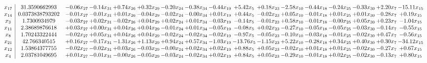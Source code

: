 \documentclass[9pt]{article}
\begin{document}
 \[\begin{array}{c| c c@{\hskip 2pt} c@{\hskip 2pt} c@{\hskip 2pt} c@{\hskip 2pt} c@{\hskip 2pt} c@{\hskip 2pt} c@{\hskip 2pt} c@{\hskip 2pt} c@{\hskip 2pt} c@{\hskip 2pt} c@{\hskip 2pt} c@{\hskip 2pt} c@{\hskip 2pt} c@{\hskip 2pt} c@{\hskip 2pt} }
 x_{17}   &  31.3590662993 & -0.06 x_{27} & -0.14 x_{31} & +  0.74 x_{26} & +  0.32 x_{29} & -0.20 x_{24} & -0.38 x_{34} & -0.44 x_{19} & +  5.42 x_{5} & +  0.18 x_{23} & -2.58 x_{10} & -0.44 x_{18} & -0.24 x_{25} & -0.33 x_{30} & +  2.20 x_{7} & -15.11 x_{15}\\
 x_{14}   &  0.0373838793202 & -0.01 x_{27} & -0.01 x_{31} & +  0.01 x_{26} & -0.04 x_{29} & -0.02 x_{24} & -0.00 x_{34} & +  0.01 x_{19} & +  0.44 x_{5} & -0.02 x_{23} & +  0.05 x_{10} & -0.01 x_{18} & +  0.01 x_{25} & +  0.01 x_{30} & -0.28 x_{7} & +  0.19 x_{15}\\
 x_{3}   &  1.7300934979 & -0.03 x_{27} & +  0.02 x_{31} & -0.02 x_{26} & +  0.04 x_{29} & +  0.02 x_{24} & +  0.01 x_{34} & -0.03 x_{19} & -0.14 x_{5} & -0.01 x_{23} & +  0.58 x_{10} & -0.01 x_{18} & -0.00 x_{25} & +  0.05 x_{30} & +  0.23 x_{7} & -1.04 x_{15}\\
 x_{11}   &  2.38689876618 & +  0.03 x_{27} & +  0.00 x_{31} & +  0.04 x_{26} & +  0.04 x_{29} & -0.01 x_{24} & +  0.01 x_{34} & -0.05 x_{19} & -0.08 x_{5} & +  0.02 x_{23} & -0.27 x_{10} & -0.05 x_{18} & -0.05 x_{25} & -0.03 x_{30} & -0.14 x_{7} & -0.55 x_{15}\\
 x_{8}   &  1.70243322444 & -0.02 x_{27} & +  0.05 x_{31} & +  0.04 x_{26} & +  0.04 x_{29} & -0.02 x_{24} & -0.02 x_{34} & -0.02 x_{19} & -0.97 x_{5} & -0.05 x_{23} & -0.10 x_{10} & -0.03 x_{18} & -0.01 x_{25} & -0.02 x_{30} & +  0.47 x_{7} & -0.56 x_{15}\\
 x_{21}   &  42.766340515 & +  0.16 x_{27} & -0.17 x_{31} & -1.31 x_{26} & +  1.13 x_{29} & +  0.94 x_{24} & +  0.57 x_{34} & -1.03 x_{19} & -13.76 x_{5} & -1.15 x_{23} & +  5.22 x_{10} & -0.28 x_{18} & +  0.34 x_{25} & +  0.40 x_{30} & +  0.30 x_{7} & -34.12 x_{15}\\
 x_{12}   &  1.53864377755 & -0.02 x_{27} & -0.02 x_{31} & +  0.03 x_{26} & -0.03 x_{29} & -0.00 x_{24} & +  0.02 x_{34} & +  0.02 x_{19} & +  0.88 x_{5} & +  0.05 x_{23} & -0.02 x_{10} & +  0.01 x_{18} & +  0.01 x_{25} & -0.02 x_{30} & -0.27 x_{7} & +  0.67 x_{15}\\
 x_{4}   &  2.03781049695 & +  0.01 x_{27} & -0.01 x_{31} & -0.00 x_{26} & -0.05 x_{29} & -0.03 x_{24} & -0.02 x_{34} & +  0.02 x_{19} & +  0.84 x_{5} & +  0.05 x_{23} & -0.29 x_{10} & -0.01 x_{18} & +  0.02 x_{25} & -0.02 x_{30} & -0.13 x_{7} & +  0.80 x_{15}\\

\end{array}\]
\end{document}
